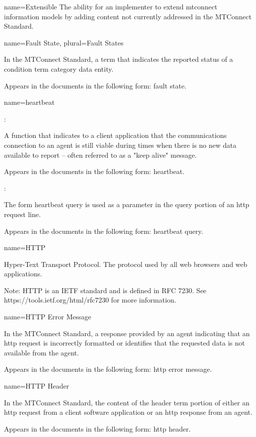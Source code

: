 {
  name={Extensible}
}
{
	The ability for an implementer to extend \glspl{mtconnect information model} by adding content not currently addressed in the MTConnect Standard.
}


{
  name={Fault State},
  plural={Fault States}
}
{
	In the MTConnect Standard, a term that indicates the reported status of a \gls{condition term} category \gls{data entity}.   

	Appears in the documents in the following form: \gls{fault state}.
}


{
  name={heartbeat}
}
{
	:

	A function that indicates to a client application that the communications connection to an \gls{agent} is still viable during times when there is no new data available to report – often referred to as a "keep alive" message.

	Appears in the documents in the following form: \gls{heartbeat}.

	:

	The form \gls{heartbeat query} is used as a parameter in the query portion of an \gls{http request line}.

	Appears in the documents in the following form: \gls{heartbeat query}.
}


{
  name={HTTP}
}
{
	Hyper-Text Transport Protocol.  The protocol used by all web browsers and web applications.

    \begin{note}
	Note:  HTTP is an IETF standard and is defined in RFC 7230.  See https://tools.ietf.org/html/rfc7230 for more information.
	\end{note}
}


{
  name={HTTP Error Message}
}
{
	In the MTConnect Standard, a response provided by an \gls{agent} indicating that an \gls{http request} is incorrectly formatted or identifies that the requested data is not available from the \gls{agent}.  

	Appears in the documents in the following form: \gls{http error message}.
}


{
  name={HTTP Header}
}
{
	In the MTConnect Standard, the content of the \gls{header term} portion of either an \gls{http request} from a client software application or an \gls{http response} from an \gls{agent}.

	Appears in the documents in the following form: \gls{http header}.
}


